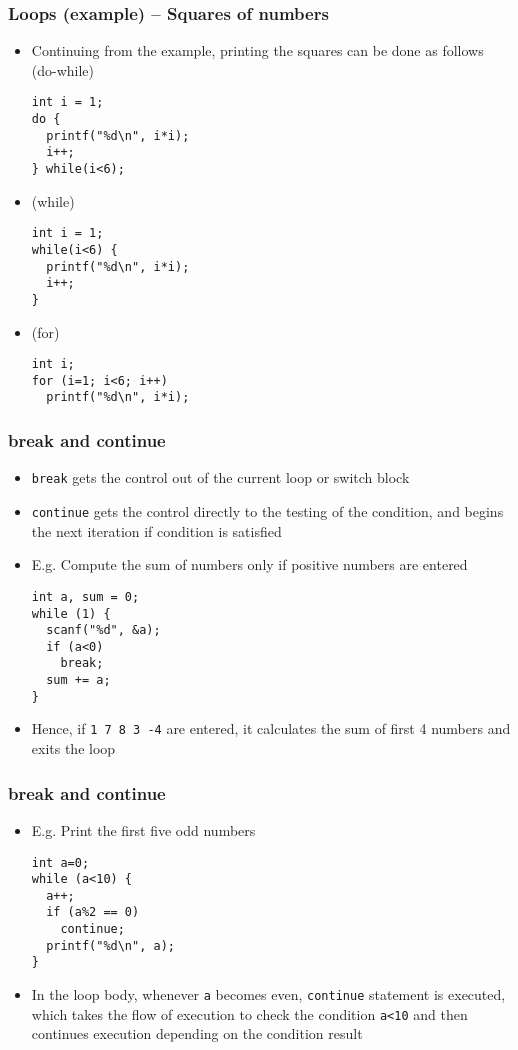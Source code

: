 \documentclass[11pt]{beamer}
\begin{document}
\begin{frame}[fragile]\frametitle{Loops (example) -- Squares of numbers}
\label{sec-1-18}

\begin{itemize}
\item Continuing from the example, printing the squares can be done as follows (do-while)

\begin{verbatim}
int i = 1;
do {
  printf("%d\n", i*i);
  i++;
} while(i<6);
\end{verbatim}
\item (while)

\begin{verbatim}
int i = 1;
while(i<6) {
  printf("%d\n", i*i);
  i++;
}
\end{verbatim}
\item (for)

\begin{verbatim}
int i;
for (i=1; i<6; i++) 
  printf("%d\n", i*i);
\end{verbatim}
\end{itemize}
\end{frame}
\begin{frame}[fragile]\frametitle{break and continue}
\label{sec-1-19}

\begin{itemize}
\item \verb~break~ gets the control out of the current loop or switch block
\item \verb~continue~ gets the control directly to the testing of the condition, and begins the next iteration if condition is satisfied
\item E.g. Compute the sum of numbers only if positive numbers are entered

\begin{verbatim}
int a, sum = 0;
while (1) {
  scanf("%d", &a);
  if (a<0)
    break;
  sum += a;
}
\end{verbatim}
\item Hence, if \verb~1 7 8 3 -4~ are entered, it calculates the sum of first 4 numbers and exits the loop
\end{itemize}
\end{frame}
\begin{frame}[fragile]\frametitle{break and continue}
\label{sec-1-20}

\begin{itemize}
\item E.g. Print the first five odd numbers

\begin{verbatim}
int a=0;
while (a<10) {
  a++;
  if (a%2 == 0)
    continue;
  printf("%d\n", a);
}
\end{verbatim}
\item In the loop body, whenever \verb~a~ becomes even, \verb~continue~ statement is executed, which takes the flow of execution to check the condition \verb~a<10~ and then continues execution depending on the condition result
\end{itemize}
\end{frame}
\end{document}
